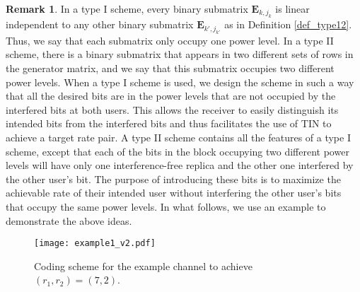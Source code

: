 \documentclass[12pt, draftclsnofoot, onecolumn]{IEEEtran}
\theoremstyle{definition}
\newtheorem{remark}{Remark}
\begin{document}
\begin{remark}
In a type I scheme, every binary submatrix $\boldsymbol{E}_{k,j_k}$ is linear independent to any other binary submatrix $\boldsymbol{E}_{k',j_{k'}}$ as in Definition \ref{def_type12}. Thus, we say that each submatrix only occupy one power level. In a type II scheme, there is a binary submatrix that appears in two different sets of rows in the generator matrix, and we say that this submatrix occupies two different power levels. When a type I scheme is used, we design the scheme in such a way that all the desired bits are in the power levels that are not occupied by the interfered bits at both users. This allows the receiver to easily distinguish its intended bits from the interfered bits and thus facilitates the use of TIN to achieve a target rate pair. A type II scheme contains all the features of a type I scheme, except that each of the bits in the block occupying two different power levels will have only one interference-free replica and the other one interfered by the other user's bit. The purpose of introducing these bits is to maximize the achievable rate of their intended user without interfering the other user's bits that occupy the same power levels. In what follows, we use an example to demonstrate the above ideas. %
\end{remark}

\begin{figure}[t!]
	\centering
\texttt{[image: example1\_v2.pdf]}
\caption{Coding scheme for the example channel to achieve $(r_1,r_2) = (7,2)$.}
\label{fig:example1}
\end{figure}
\end{document}
